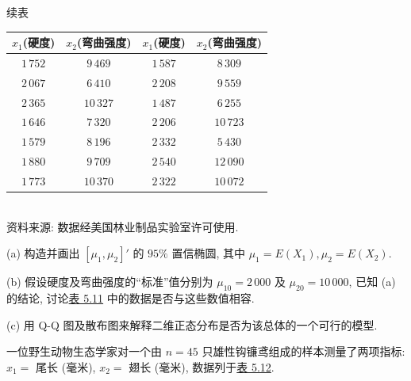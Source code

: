 \begin{mvtable}
\centering
{\small 续表}\\[2pt]
\begin{tabular}{|c|c||c|c|}
\hline
$x_{1}$(硬度) & $x_{2}$(弯曲强度) & $x_{1}$(硬度) & $x_{2}$(弯曲强度)\\
\hline
$1\,752$ & $9\,469$ & $1\,587$ & $8\,309$\\
$2\,067$ & $6\,410$ & $2\,208$ & $9\,559$\\
$2\,365$ & $10\,327$ & $1\,487$ & $6\,255$\\
$1\,646$ & $7\,320$ & $2\,206$ & $10\,723$\\
$1\,579$ & $8\,196$ & $2\,332$ & $5\,430$\\
$1\,880$ & $9\,709$ & $2\,540$ & $12\,090$\\
$1\,773$ & $10\,370$ & $2\,322$ & $10\,072$\\
\hline
\end{tabular}\\[3pt]
{\footnotesize 资料来源: 数据经美国林业制品实验室许可使用.}
\end{mvtable}

\noindent (a) 构造并画出 $[\mu_{1},\mu_{2}]'$ 的 $95\%$ 置信椭圆, 其中 $\mu_{1}=E(X_{1}),\mu_{2}=E(X_{2})$.

\noindent (b) 假设硬度及弯曲强度的“标准”值分别为 $\mu_{10}=2\,000$ 及 $\mu_{20}=10\,000$, 已知 (a) 的结论, 讨论\hyperref[tab:5.11]{表 5.11} 中的数据是否与这些数值相容.

\noindent (c) 用 Q-Q 图及散布图来解释二维正态分布是否为该总体的一个可行的模型.

\medskip
\noindent{}\quad 一位野生动物生态学家对一个由 $n=45$ 只雄性钩镰鸢组成的样本测量了两项指标: $x_{1}=$ 尾长 (毫米), $x_{2}=$ 翅长 (毫米), 数据列于\hyperref[tab:5.12]{表 5.12}.

